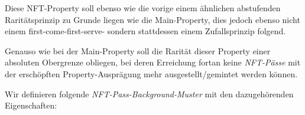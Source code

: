 \vspace{0.5cm}

\begin{NFT-Prop}

Diese NFT-Property soll ebenso wie die vorige einem ähnlichen abstufenden \newline Raritätsprinzip zu Grunde liegen wie die Main-Property, dies jedoch ebenso nicht einem first-come-first-serve- sondern stattdessen einem Zufallsprinzip folgend.

Genauso wie bei der Main-Property soll die Rarität dieser Property einer absoluten Obergrenze obliegen, bei deren Erreichung fortan keine \textit{NFT-Pässe} mit der erschöpften Property-Ausprägung mehr ausgestellt/gemintet werden können.

\vspace{0.3cm}

Wir definieren folgende \textit{NFT-Pass-Background-Muster} mit den dazugehörenden Eigenschaften:


\end{NFT-Prop}
